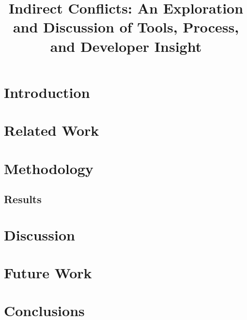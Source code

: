 \documentclass[conference]{IEEEtran}
\begin{document}
\title{Indirect Conflicts: An Exploration and Discussion of Tools, Process, and Developer Insight}

\author{
}

\author{
}

\maketitle

\begin{abstract}

\end{abstract}

\section{Introduction}

\section{Related Work}

\section{Methodology}

\subsection{Results}

\section{Discussion}

\section{Future Work}

\section{Conclusions}


\balance


\end{document}
